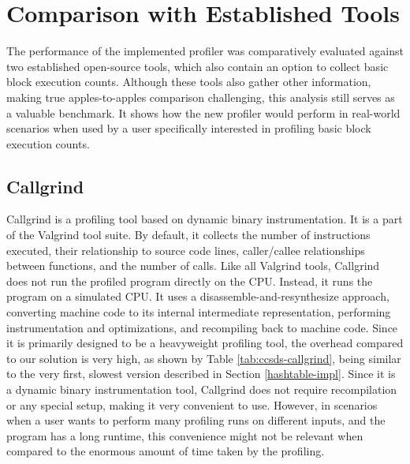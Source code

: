 \chapter{Comparison with Established Tools}
\label{compare}
The performance of the implemented profiler was comparatively evaluated against two established open-source tools, which also contain an option to collect basic block execution counts. Although these tools also gather other information, making true apples-to-apples comparison challenging, this analysis still serves as a valuable benchmark. It shows how the new profiler would perform in real-world scenarios when used by a user specifically interested in profiling basic block execution counts.



\section{Callgrind}
Callgrind is a profiling tool based on dynamic binary instrumentation. It is a part of the Valgrind tool suite. By default, it collects the number of instructions executed, their relationship to source code lines, caller/callee relationships between functions, and the number of calls. Like all Valgrind tools, Callgrind does not run the profiled program directly on the CPU. Instead, it runs the program on a simulated CPU. It uses a disassemble-and-resynthesize approach, converting machine code to its internal intermediate representation, performing instrumentation and optimizations, and recompiling back to machine code. Since it is primarily designed to be a heavyweight profiling tool, the overhead compared to our solution is very high, as shown by Table \ref{tab:ccsds-callgrind}, being similar to the very first, slowest version described in Section \ref{hashtable-impl}. Since it is a dynamic binary instrumentation tool, Callgrind does not require recompilation or any special setup, making it very convenient to use. However, in scenarios when a user wants to perform many profiling runs on different inputs, and the program has a long runtime, this convenience might not be relevant when compared to the enormous amount of time taken by the profiling. \cite{valgrind}

